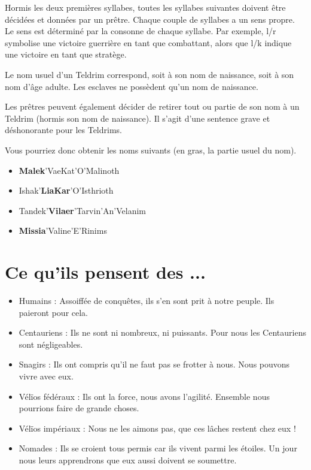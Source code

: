 \begin{multicols}{2}
Hormis les deux premières syllabes, toutes les syllabes suivantes doivent être décidées et données par un prêtre. Chaque couple de syllabes a un sens propre. Le sens est déterminé par la consonne de chaque syllabe. Par exemple, l/r symbolise une victoire guerrière en tant que combattant, alors que l/k indique une victoire en tant que stratège.

Le nom usuel d'un Teldrim correspond, soit à son nom de naissance, soit à son nom d'âge adulte. Les esclaves ne possèdent qu'un nom de naissance.

Les prêtres peuvent également décider de retirer tout ou partie de son nom à un Teldrim (hormis son nom de naissance). Il s'agit d'une sentence grave et déshonorante pour les Teldrims.

Vous pourriez donc obtenir les noms suivants (en gras, la partie usuel du nom).

\begin{itemize}
\item \textbf{Malek}'VaeKat'O'Malinoth
\item Ishak'\textbf{LiaKar}'O'Isthrioth
\item Tandek'\textbf{Vilaer}'Tarvin'An'Velanim
\item \textbf{Missia}'Valine'E'Rinims
\end{itemize}

\section{Ce qu'ils pensent des ...}

\begin{itemize}
\item Humains : Assoiffée de conquêtes, ils s'en sont prit à notre peuple. Ils paieront pour cela.
\item Centauriens : Ils ne sont ni nombreux, ni puissants. Pour nous les Centauriens sont négligeables.
\item Snagirs : Ils ont compris qu'il ne faut pas se frotter à nous. Nous pouvons vivre avec eux.
\item Vélïos fédéraux : Ils ont la force, nous avons l'agilité. Ensemble nous pourrions faire de grande choses.
\item Vélïos impériaux : Nous ne les aimons pas, que ces lâches restent chez eux !
\item Nomades : Ils se croient tous permis car ils vivent parmi les étoiles. Un jour nous leurs apprendrons que eux aussi doivent se soumettre.
\end{itemize}

\end{multicols}

